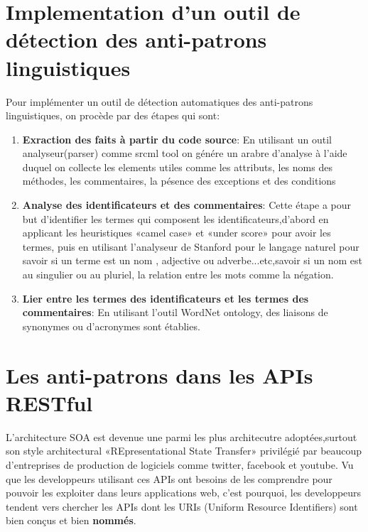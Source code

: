 \section{Implementation d’un outil de  détection des anti-patrons linguistiques}
Pour implémenter un outil de détection automatiques des anti-patrons linguistiques, on procède par des étapes qui sont\cite{arnaoudova2013new}:\\
\begin{enumerate}
    

\item \textbf {Exraction des faits à partir du code source}: En utilisant un outil analyseur(parser) comme srcml tool on génére un arabre d’analyse à l’aide duquel on collecte les elements utiles comme les attributs, les noms des méthodes, les commentaires, la pésence des exceptions et des conditions
\item \textbf {Analyse des identificateurs et des commentaires}:
Cette étape a pour but d’identifier les termes qui composent les identificateurs,d’abord en applicant les heuristiques «camel case» et «under score» pour avoir les termes, puis en utilisant l’analyseur de Stanford pour le langage naturel pour savoir si un terme est un nom , adjective ou adverbe...etc,savoir si un nom est au singulier ou au pluriel, la relation entre les mots comme la négation.
\item \textbf{Lier entre les termes des identificateurs et les termes des commentaires}: En utilisant l’outil WordNet ontology, des liaisons de synonymes ou  d’acronymes sont établies.
\end{enumerate}

\section{Les anti-patrons dans les APIs RESTful}
L’architecture SOA est devenue une parmi les plus architecutre adoptées,surtout son style architectural «REpresentational State Transfer» privilégié par beaucoup d’entreprises de production de logiciels comme twitter, facebook et youtube.
Vu que les developpeurs utilisant ces APIs ont besoins de les comprendre pour pouvoir les exploiter dans leurs applications web, c’est pourquoi, les developpeurs tendent vers chercher les APIs dont les URIs (Uniform Resource Identifiers) sont bien conçus et bien \textbf{nommés}.

